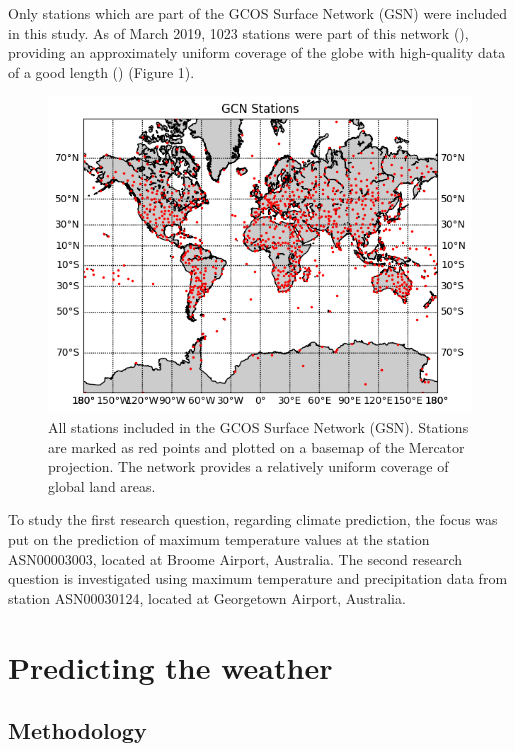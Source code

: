 \documentclass[12pt]{article}
\begin{document}
    Only stations which are part of the GCOS Surface Network (GSN) were included in this study. As of March 2019, 1023 stations were part 
    of this network (\cite{oakley_2019_gcos}), providing an approximately uniform coverage of the globe with high-quality data of a good 
    length (\cite{theglobalclimateobservingsystem_gcos}) (Figure 1).

    \begin{figure}
        \centering
        \includegraphics[scale = 1.0]{all_stations.png}
        \caption{All stations included in the GCOS Surface Network (GSN). Stations are marked as red points and plotted on a basemap of 
        the Mercator projection. The network provides a relatively uniform coverage of global land areas.}
        \label{fig:all_stations}
    \end{figure}

    To study the first research question, regarding climate prediction, the focus was put on the prediction of maximum temperature values 
    at the station ASN00003003, located at Broome Airport, Australia. The second research question is investigated using maximum temperature 
    and precipitation data from station ASN00030124, located at Georgetown Airport, Australia.

\section{Predicting the weather}

    \subsection{Methodology}
\end{document}

